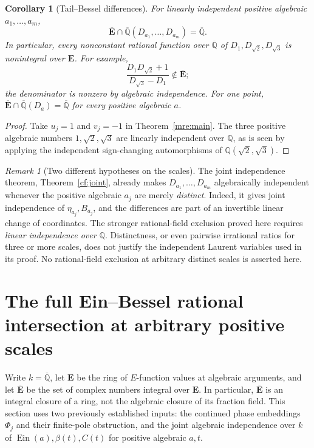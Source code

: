 \documentclass[11pt]{article}
\newtheorem{corollary}[theorem]{Corollary}
\theoremstyle{definition}
\theoremstyle{remark}
\newtheorem{remark}[theorem]{Remark}
\newcommand{\Qa}{\overline{\mathbb Q}}
\newcommand{\E}{\mathbf E}
\newcommand{\Ebar}{\overline{\mathbf E}}
\newcommand{\Ein}{\operatorname{Ein}}
\begin{document}
\begin{corollary}[Tail--Bessel differences]\label{mre:differences}
For linearly independent positive algebraic $a_1,\ldots,a_m$,
\[
 \Ebar\cap\Qa(D_{a_1},\ldots,D_{a_m})=\Qa.
\]
In particular, every nonconstant rational function over $\Qa$ of
$D_1,D_{\sqrt2},D_{\sqrt3}$ is nonintegral over $\E$.
For example,
\[
 \frac{D_1D_{\sqrt2}+1}{D_{\sqrt3}-D_1}\notin\Ebar;
\]
the denominator is nonzero by algebraic independence.
For one point, $\Ebar\cap\Qa(D_a)=\Qa$ for every positive algebraic $a$.
\end{corollary}
\begin{proof}
Take $u_j=1$ and $v_j=-1$ in Theorem~\ref{mre:main}.
The three positive algebraic numbers $1,\sqrt2,\sqrt3$ are linearly
independent over $\mathbb Q$, as is seen by applying the independent
sign-changing automorphisms of $\mathbb Q(\sqrt2,\sqrt3)$.
\end{proof}

\begin{remark}[Two different hypotheses on the scales]
The joint independence theorem, Theorem~\ref{cf:joint}, already makes
$D_{a_1},\ldots,D_{a_m}$ algebraically independent whenever the positive
algebraic $a_j$ are merely \emph{distinct}. Indeed, it gives joint
independence of $\eta_{a_j},B_{a_j}$, and the differences are part of an
invertible linear change of coordinates.
The stronger rational-field exclusion proved here requires
\emph{linear independence over $\mathbb Q$}. Distinctness, or even
pairwise irrational ratios for three or more scales, does not justify
the independent Laurent variables used in its proof. No rational-field
exclusion at arbitrary distinct scales is asserted here.
\end{remark}


\section{The full Ein--Bessel rational intersection at arbitrary positive scales}
\label{fri:section}

Write $k=\overline{\mathbb Q}$, let $\mathbf E$ be the ring of
$E$-function values at algebraic arguments, and let
$\overline{\mathbf E}$ be the set of complex numbers integral over
$\mathbf E$.  In particular, $\overline{\mathbf E}$ is an integral
closure of a ring, not the algebraic closure of its fraction field.
This section uses two previously established inputs: the continued
phase embeddings $\Phi_j$ and their finite-pole obstruction, and the
joint algebraic independence over $k$ of
$\Ein(a),\beta(t),C(t)$ for positive algebraic $a,t$.
\end{document}
